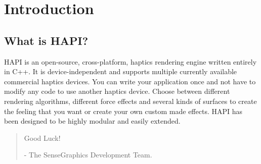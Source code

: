 
\chapter{Introduction}

\section{What is HAPI?}
HAPI is an open-source, cross-platform, haptics rendering engine written entirely in C++. It is device-independent and supports multiple currently available commercial haptics devices. You can write your application once and not have to modify any code to use another haptics device.
 Choose between different rendering algorithms, different force effects
 and several kinds of surfaces to create the feeling that you want or create your own custom made effects. HAPI has been designed to be highly modular and easily extended.

\begin{quotation}
Good Luck!

- The SenseGraphics Development Team.
\end{quotation}




 



